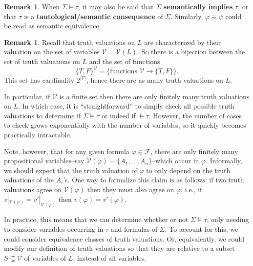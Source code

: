 \documentclass[12pt]{article}
\theoremstyle{definition}
\newtheorem{remark}[theorem]{Remark}
\renewcommand{\phi}{\varphi}
\newcommand{\<}{\langle}
\renewcommand{\>}{\rangle}
\newcommand{\seq}{\subseteq}
\newcommand{\FF}{\mathcal{F}}
\newcommand{\VV}{\mathcal{V}}
\newcommand{\keyword}{\textbf}
\begin{document}
\begin{remark}
    When $\Sigma \vDash \tau$, it may also be said that $\Sigma$ \keyword{semantically implies} $\tau$, or that $\tau$ is a \keyword{tautological/semantic consequence} of $\Sigma$.
    Similarly, $\phi \equiv \psi$ could be read as semantic equivalence.
\end{remark}

\begin{remark}
    Recall that truth valuations on $L$ are characterized by their valuation on the set of variables $\VV = \VV(L)$.
    So there is a bijection between the set of truth valuations on $L$ and the set of functions
    \[
        \{T, F\}^\VV = \{\text{functions } \VV \to \{T, F\}\}.
    \]
    This set has cardinality $2^{|\VV|}$, hence there are as many truth valuations on $L$.

    In particular, if $\VV$ is a finite set then there are only finitely many truth valuations on $L$.
    In which case, it is ``straightforward'' to simply check all possible truth valuations to determine if $\Sigma \vDash \tau$ or indeed if $\vDash \tau$.
    However, the number of cases to check grows exponentially with the number of variables, so it quickly becomes practically intractable.

    Note, however, that for any given formula $\phi \in \FF$, there are only finitely many propositional variables--say $\VV(\phi) = \{A_1, \dots, A_n\}$--which occur in $\phi$.
    Informally, we should expect that the truth valuation of $\phi$ to only depend on the truth valuations of the $A_i$'s.
    One way to formalize this claim is as follows: if two truth valuations agree on $\VV(\phi)$ then they must also agree on $\phi$, i.e., if $v|_{\VV(\phi)} = v'|_{\VV(\phi)}$ then $v(\phi) = v'(\phi)$.

    In practice, this means that we can determine whether or not $\Sigma \vDash \tau$, only needing to consider variables occurring in $\tau$ and formulas of $\Sigma$.
    To account for this, we could consider equivalence classes of truth valuations.
    Or, equivalently, we could modify our definition of truth valuations so that they are relative to a subset $S \seq \VV$ of variables of $L$, instead of all variables.
\end{remark}
\end{document}
